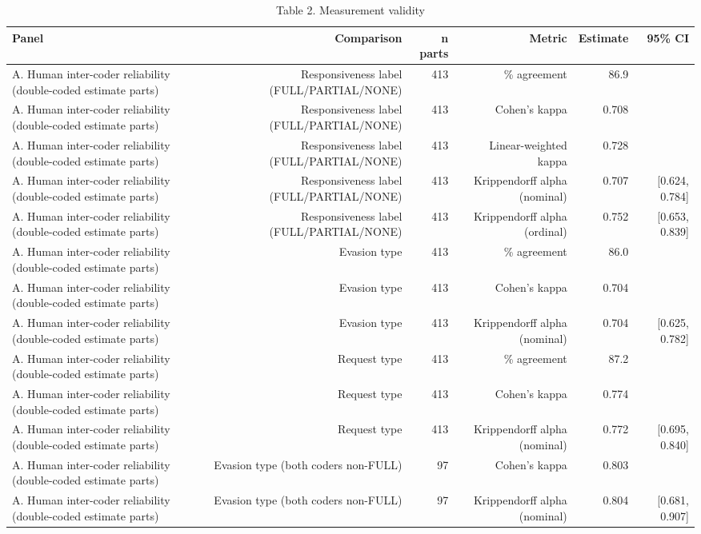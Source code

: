 \begin{table}[ht]
\centering
\small
\caption{Table 2. Measurement validity}
\begin{tabular}{lrrrrr}
\toprule
Panel & Comparison & n parts & Metric & Estimate & 95\% CI \\
\midrule
A. Human inter-coder reliability (double-coded estimate parts) & Responsiveness label (FULL/PARTIAL/NONE) & 413 & \% agreement & 86.9 &  \\
A. Human inter-coder reliability (double-coded estimate parts) & Responsiveness label (FULL/PARTIAL/NONE) & 413 & Cohen's kappa & 0.708 &  \\
A. Human inter-coder reliability (double-coded estimate parts) & Responsiveness label (FULL/PARTIAL/NONE) & 413 & Linear-weighted kappa & 0.728 &  \\
A. Human inter-coder reliability (double-coded estimate parts) & Responsiveness label (FULL/PARTIAL/NONE) & 413 & Krippendorff alpha (nominal) & 0.707 & {[}0.624, 0.784] \\
A. Human inter-coder reliability (double-coded estimate parts) & Responsiveness label (FULL/PARTIAL/NONE) & 413 & Krippendorff alpha (ordinal) & 0.752 & {[}0.653, 0.839] \\
A. Human inter-coder reliability (double-coded estimate parts) & Evasion type & 413 & \% agreement & 86.0 &  \\
A. Human inter-coder reliability (double-coded estimate parts) & Evasion type & 413 & Cohen's kappa & 0.704 &  \\
A. Human inter-coder reliability (double-coded estimate parts) & Evasion type & 413 & Krippendorff alpha (nominal) & 0.704 & {[}0.625, 0.782] \\
A. Human inter-coder reliability (double-coded estimate parts) & Request type & 413 & \% agreement & 87.2 &  \\
A. Human inter-coder reliability (double-coded estimate parts) & Request type & 413 & Cohen's kappa & 0.774 &  \\
A. Human inter-coder reliability (double-coded estimate parts) & Request type & 413 & Krippendorff alpha (nominal) & 0.772 & {[}0.695, 0.840] \\
A. Human inter-coder reliability (double-coded estimate parts) & Evasion type (both coders non-FULL) & 97 & Cohen's kappa & 0.803 &  \\
A. Human inter-coder reliability (double-coded estimate parts) & Evasion type (both coders non-FULL) & 97 & Krippendorff alpha (nominal) & 0.804 & {[}0.681, 0.907] \\

\end{tabular}
\end{table}
